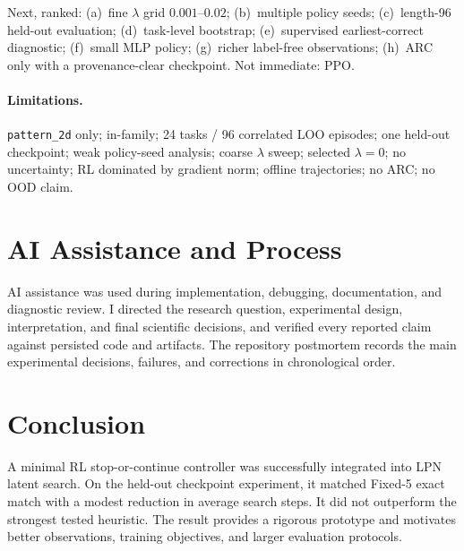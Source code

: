 \documentclass[11pt,a4paper]{article}
\begin{document}
Next, ranked:
(a)~fine $\lambda$ grid $0.001$--$0.02$;
(b)~multiple policy seeds;
(c)~length-96 held-out evaluation;
(d)~task-level bootstrap;
(e)~supervised earliest-correct diagnostic;
(f)~small MLP policy;
(g)~richer label-free observations;
(h)~ARC only with a provenance-clear checkpoint.
Not immediate: PPO.

\paragraph{Limitations.}
\texttt{pattern\_2d} only; in-family; 24 tasks / 96 correlated LOO episodes;
one held-out checkpoint; weak policy-seed analysis; coarse $\lambda$ sweep;
selected $\lambda{=}0$; no uncertainty; RL dominated by gradient norm;
offline trajectories; no ARC; no OOD claim.

\FloatBarrier
{}
\section{AI Assistance and Process}

AI assistance was used during implementation, debugging, documentation, and
diagnostic review.
I directed the research question, experimental design, interpretation, and
final scientific decisions, and verified every reported claim against persisted
code and artifacts.
The repository postmortem records the main experimental decisions, failures,
and corrections in chronological order.

\section{Conclusion}

A minimal RL stop-or-continue controller was successfully integrated into LPN
latent search.
On the held-out checkpoint experiment, it matched Fixed-5 exact match with a
modest reduction in average search steps.
It did not outperform the strongest tested heuristic.
The result provides a rigorous prototype and motivates better observations,
training objectives, and larger evaluation protocols.

\clearpage


\end{document}
